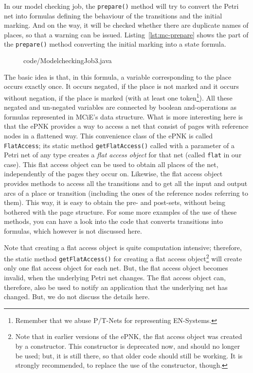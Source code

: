 \begin{description}
    In our model checking job, the {\tt prepare()} method will try to convert
    the Petri net into formulas defining the behaviour of the transitions
    and the initial marking. And on the way, it will be checked whether there
    are duplicate names of places, so that a warning can be issued.   
    Listing~\ref{lst:mc-prepare} shows the part of the {\tt prepare()} method
    converting the initial marking into a state formula.
\begin{figure}[tbp!] %
%
{code/ModelcheckingJob3.java}
\end{figure}
    The basic idea is that, in this formula, a variable corresponding to the
    place occurs exactly once. It occurs negated, if the place is not marked
    and it occurs without negation, if the place is marked (with at least one
    token\footnote
      {Remember that we abuse P/T-Nets for representing EN-Systems.}). 
    All these negated and un-negated variables are connected by boolean
    and-operations as formulas represented in MCiE's data structure.
    What is more interesting here is that the ePNK provides a way to access a net
    that consist of pages with reference nodes in a flattened way. This
    convenience class of the ePNK is called {\tt FlatAccess};%
    its static method {\tt getFlatAccess()} called with a parameter of a
    Petri net of any type creates a \emph{flat access object} for that net
    (called {\tt flat} in our case).
    This flat access object can be used to obtain all places of the net,
    independently of the  pages they occur on. Likewise, the
    flat access object provides methods to access all the transitions and to get all
    the input and output arcs of a place or transition (including the ones of
    the reference nodes referring to them). This way, it is easy to obtain the
    pre- and post-sets, without being bothered with the page structure. For some
    more examples of the use of these methods, you can have a look into the
    code that converts transitions into formulas, which however is not
    discussed here.
    
    Note that creating a flat access object is quite computation intensive;
    therefore, the static method {\tt getFlatAccess()} for creating a
    flat access object\footnote
      {Note that in earlier versions of the ePNK, the flat access object
       was created by a constructor. This constructor is deprecated now,
       and should no longer be used; but, it is still there, so that
       older code should still be working. It is strongly recommended,
       to replace the use of the constructor, though.}
    will create only one  flat access object for each net. But, the
    flat access object becomes invalid, when the underlying Petri net changes.
    The flat access object can, therefore, also be used to notify an
    application that the underlying net has changed. But, we do not discuss
    the details here.
    

\end{description}
